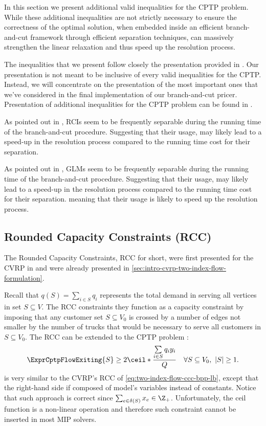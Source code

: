 In this section we present additional valid inequalities for the CPTP problem.
While these additional inequalities are not strictly necessary
to ensure the correctness of the optimal solution,
when embedded inside an efficient branch-and-cut framework through efficient separation techniques,
can massively strengthen the linear relaxation and thus speed up the resolution process.

The inequalities that we present follow closely the presentation provided in \textcite{jepsen2014}.
Our presentation is not meant to be inclusive of every valid inequalities for the CPTP.
Instead, we will concentrate on the presentation of the most important ones
that we've considered in the final implementation of our branch-and-cut pricer.
Presentation of additional inequalities for the CPTP problem can be found in \textcite{jepsen2014}.

As pointed out in \textcite{jepsen2014},
RCIs seem to be frequently separable during the running time of the branch-and-cut procedure.
Suggesting that their usage, may likely lead to a speed-up in the resolution process
compared to the running time cost for their separation.

As pointed out in \textcite{jepsen2014},
GLMs seem to be frequently separable during the running time of the branch-and-cut procedure.
Suggesting that their usage, may likely lead to a speed-up in the resolution process
compared to the running time cost for their separation.
meaning that their usage is likely to speed up the resolution process.

\subsection{Rounded Capacity Constraints (RCC)}
\label{sec:cptp-rcc}

The Rounded Capacity Constraints, RCC for short, were first presented
for the CVRP  in \textcite{laporte1983}
and were already presented in \cref{sec:intro-cvrp-two-index-flow-formulation}.

Recall that $q(S) = \sum_{i \in S} q_i$ represents
the total demand in serving all vertices in set $S \subseteq V$.
The RCC constraints they function as a capacity constraint
by imposing that any customer set $S \subseteq V_0$ is crossed by a number of edges
not smaller by the number of trucks that would be necessary to serve all customers in $S \subseteq V_0$.
The RCC can be extended to the CPTP problem \parencite{jepsen2014}:
\begin{equation}
	\label{eq:cptp-rcc-inequality-original}
	\ExprCptpFlowExiting{S} \ge 2 \ceil*{\frac{\sum\limits_{i \in S} q_i y_i}{Q}} \quad \forall S \subseteq V_0,\ |S| \ge 1.
\end{equation}
is very similar to the CVRP's RCC of \cref{eq:two-index-flow-ccc-bpp-lb},
except that the right-hand side if composed of model's variables instead of constants.
Notice that such approach is correct since $\sum_{e \in \delta(S)} x_e \in \Z_+$.
Unfortunately, the ceil function is a non-linear operation and therefore
such constraint cannot be inserted in most MIP solvers.

